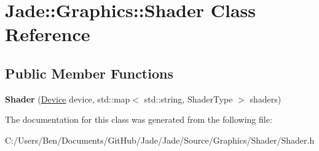 \hypertarget{class_jade_1_1_graphics_1_1_shader}{}\section{Jade\+:\+:Graphics\+:\+:Shader Class Reference}
\label{class_jade_1_1_graphics_1_1_shader}
\subsection*{Public Member Functions}
\begin{DoxyCompactItemize}
\item 
\hypertarget{class_jade_1_1_graphics_1_1_shader_a6ba8cfe295f29771b8b56590ff39181b}{}{\bfseries Shader} (\hyperlink{class_jade_1_1_graphics_1_1_device}{Device} device, std\+::map$<$ std\+::string, Shader\+Type $>$ shaders)\label{class_jade_1_1_graphics_1_1_shader_a6ba8cfe295f29771b8b56590ff39181b}

\end{DoxyCompactItemize}


The documentation for this class was generated from the following file\+:\begin{DoxyCompactItemize}
\item 
C\+:/\+Users/\+Ben/\+Documents/\+Git\+Hub/\+Jade/\+Jade/\+Source/\+Graphics/\+Shader/Shader.\+h\end{DoxyCompactItemize}
